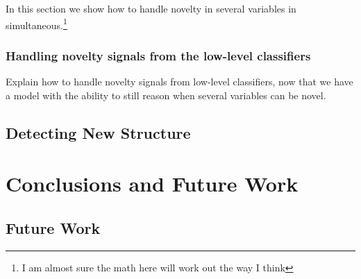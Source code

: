 In this section we show how to handle novelty in several variables
in simultaneous.\footnote{I am almost sure the math here will work out the
way I think}

\subsection{Handling novelty signals from the low-level classifiers}
Explain how to handle novelty signals from low-level classifiers, now that we
have a model with the ability to still reason when several variables can be
novel.

\section{Detecting New Structure}

\chapter{Conclusions and Future Work}\label{chap:conclusions}
\section{Future Work}

